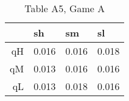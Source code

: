 \begin{table}[ht]
\centering
\begin{tabular}{rlll}
  \hline
 & sh & sm & sl \\ 
  \hline
qH & 0.016 & 0.016 & 0.018 \\ 
  qM & 0.013 & 0.016 & 0.016 \\ 
  qL & 0.013 & 0.018 & 0.016 \\ 
   \hline
\end{tabular}
\caption{Table A5, Game A} 
\end{table}

